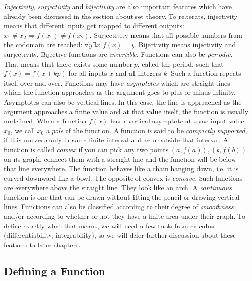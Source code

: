 \emph{Injectivity}, \emph{surjectivity} and \emph{bijectivity} are also important features which have already been discussed in the section about set theory. To reiterate, injectivity means that different inputs get mapped to different outputs: $x_1 \neq x_2 \Rightarrow f(x_1) \neq f(x_2)$. Surjectivity means that all possible numbers from the codomain are reached: $\forall y \exists x: f(x) = y$. Bijectivity means injectivity and surjectivity. Bijective functions are \emph{invertible}. Functions can also be \emph{periodic}. That means that there exists some number $p$, called the period, such that $f(x) = f(x + k p)$ for all inputs $x$ and all integers $k$. Such a function repeats itself over and over. Functions may have \emph{asymptotes} which are straight lines which the function approaches as the argument goes to plus or minus infinity. Asymptotes can also be vertical lines. In this case, the line is approached as the argument approaches a finite value and at that value itself, the function is usually undefined. When a function $f(x)$ has a vertical asymptote at some input value $x_0$, we call $x_0$ a \emph{pole} of the function. A function is said to be \emph{compactly supported}, if it is nonzero only in some finite interval and zero outside that interval. A function is called \emph{convex} if you can pick any two points $(a,f(a)),(b,f(b))$ on its graph, connect them with a straight line and the function will be below that line everywhere. The function behaves like a chain hanging down, i.e. it is curved downward like a bowl. The opposite of convex is \emph{concave}. Such functions are everywhere above the straight line. They look like an arch. A \emph{continuous} function is one that can be drawn without lifting the pencil or drawing vertical lines. Functions can also be classified according to their degree of \emph{smoothness} and/or according to whether or not they have a finite area under their graph. To define exactly what that means, we will need a few tools from calculus (differentiability, integrability), so we will defer further discussion about these features to later chapters.


\subsection{Defining a Function}

